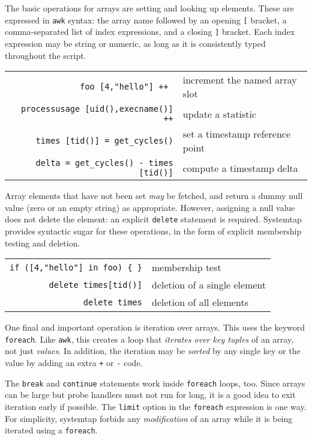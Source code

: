 \documentclass{article}
\renewcommand{\nomenclature}[2]{}
\begin{document}
The basic operations for arrays are setting and looking up elements.
These are expressed in \verb+awk+ syntax: the array name followed by
an opening \verb+[+ bracket, a comma-separated list of index
expressions, and a closing \verb+]+ bracket.  Each index expression
may be string or numeric, as long as it is consistently typed
throughout the script.
\nomenclature{arity}{Number of indexes to an array, or number of parameters
to a function.}

\begin{tabular}{rl}
\verb|foo [4,"hello"] ++ | & increment the named array slot \\
\verb|processusage [uid(),execname()] ++| & update a statistic \\
\verb|times [tid()] = get_cycles()| & set a timestamp reference point \\
\verb|delta = get_cycles() - times [tid()]| & compute a timestamp delta \\
\end{tabular}

Array elements that have not been set {\em may} be fetched, and return
a dummy null value (zero or an empty string) as appropriate.  However,
assigning a null value does not delete the element: an explicit
\verb|delete| statement is required.  \nomenclature{null value}{A
default initialized value for globals and array elements: a zero or an
empty string, depending on type.}  Systemtap provides syntactic sugar
for these operations, in the form of explicit membership testing and
deletion.

\begin{tabular}{rl}
\verb|if ([4,"hello"] in foo) { }| & membership test \\
\verb|delete times[tid()]| & deletion of a single element \\
\verb|delete times| & deletion of all elements \\
\end{tabular}

One final and important operation is iteration over arrays.  This uses
the keyword \verb+foreach+.  Like \verb+awk+, this creates a loop that
{\em iterates over key tuples} of an array, not just {\em values}.  In
addition, the iteration may be {\em sorted} by any single key or the
value by adding an extra \verb|+| or \verb|-| code.

The \verb+break+ and \verb+continue+ statements work inside
\verb+foreach+ loops, too.  Since arrays can be large but probe
handlers must not run for long, it is a good idea to exit iteration
early if possible.  The \verb+limit+ option in the \verb+foreach+
expression is one way.  For simplicity, systemtap forbids any {\em
modification} of an array while it is being iterated using a
\verb+foreach+.
\end{document}
